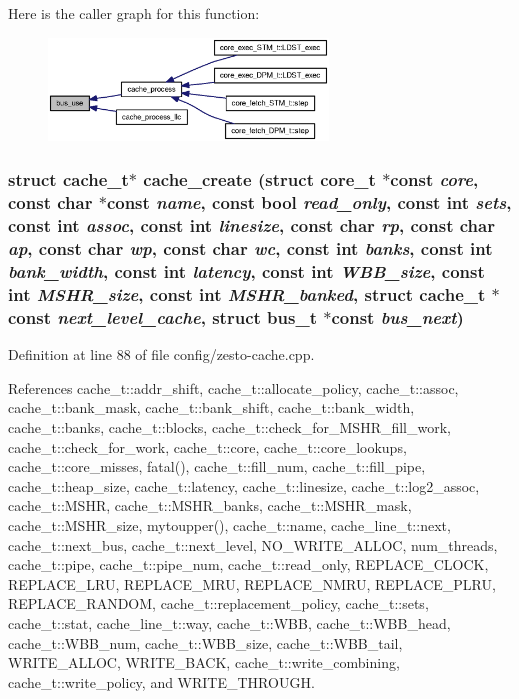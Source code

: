 Here is the caller graph for this function:\nopagebreak
\begin{figure}[H]
\begin{center}
\leavevmode
\includegraphics[width=211pt]{zesto-cache_8h_cb6440bff7b9405665cbae0d836630f3_icgraph}
\end{center}
\end{figure}
\subsubsection[{cache\_\-create}]{\setlength{\rightskip}{0pt plus 5cm}struct {\bf cache\_\-t}$\ast$ cache\_\-create (struct {\bf core\_\-t} $\ast$const  {\em core}, \/  const char $\ast$const  {\em name}, \/  const bool {\em read\_\-only}, \/  const int {\em sets}, \/  const int {\em assoc}, \/  const int {\em linesize}, \/  const char {\em rp}, \/  const char {\em ap}, \/  const char {\em wp}, \/  const char {\em wc}, \/  const int {\em banks}, \/  const int {\em bank\_\-width}, \/  const int {\em latency}, \/  const int {\em WBB\_\-size}, \/  const int {\em MSHR\_\-size}, \/  const int {\em MSHR\_\-banked}, \/  struct {\bf cache\_\-t} $\ast$const  {\em next\_\-level\_\-cache}, \/  struct {\bf bus\_\-t} $\ast$const  {\em bus\_\-next})\hspace{0.3cm}{\tt  [read]}}\label{zesto-cache_8h_f37d0719955363306947d707ca6a56f3}




Definition at line 88 of file config/zesto-cache.cpp.

References cache\_\-t::addr\_\-shift, cache\_\-t::allocate\_\-policy, cache\_\-t::assoc, cache\_\-t::bank\_\-mask, cache\_\-t::bank\_\-shift, cache\_\-t::bank\_\-width, cache\_\-t::banks, cache\_\-t::blocks, cache\_\-t::check\_\-for\_\-MSHR\_\-fill\_\-work, cache\_\-t::check\_\-for\_\-work, cache\_\-t::core, cache\_\-t::core\_\-lookups, cache\_\-t::core\_\-misses, fatal(), cache\_\-t::fill\_\-num, cache\_\-t::fill\_\-pipe, cache\_\-t::heap\_\-size, cache\_\-t::latency, cache\_\-t::linesize, cache\_\-t::log2\_\-assoc, cache\_\-t::MSHR, cache\_\-t::MSHR\_\-banks, cache\_\-t::MSHR\_\-mask, cache\_\-t::MSHR\_\-size, mytoupper(), cache\_\-t::name, cache\_\-line\_\-t::next, cache\_\-t::next\_\-bus, cache\_\-t::next\_\-level, NO\_\-WRITE\_\-ALLOC, num\_\-threads, cache\_\-t::pipe, cache\_\-t::pipe\_\-num, cache\_\-t::read\_\-only, REPLACE\_\-CLOCK, REPLACE\_\-LRU, REPLACE\_\-MRU, REPLACE\_\-NMRU, REPLACE\_\-PLRU, REPLACE\_\-RANDOM, cache\_\-t::replacement\_\-policy, cache\_\-t::sets, cache\_\-t::stat, cache\_\-line\_\-t::way, cache\_\-t::WBB, cache\_\-t::WBB\_\-head, cache\_\-t::WBB\_\-num, cache\_\-t::WBB\_\-size, cache\_\-t::WBB\_\-tail, WRITE\_\-ALLOC, WRITE\_\-BACK, cache\_\-t::write\_\-combining, cache\_\-t::write\_\-policy, and WRITE\_\-THROUGH.

